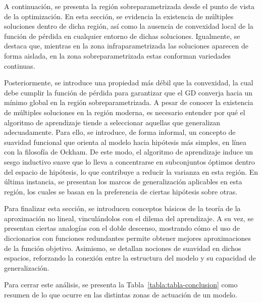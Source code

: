 A continuación, se presenta la región sobreparametrizada desde el punto de vista de la optimización. En esta sección, se evidencia la existencia de múltiples soluciones dentro de dicha región, así como la ausencia de convexidad local de la función de pérdida en cualquier entorno de dichas soluciones. Igualmente, se destaca que, mientras en la zona infraparametrizada las soluciones aparecen de forma aislada, en la zona sobreparametrizada estas conforman variedades continuas. 

Posteriormente, se introduce una propiedad más débil que la convexidad, la cual debe cumplir la función de pérdida para garantizar que el GD converja hacia un mínimo global en la región sobreparametrizada. A pesar de conocer la existencia de múltiples soluciones en la región moderna, es necesario entender por qué el algoritmo de aprendizaje tiende a seleccionar aquellas que generalizan adecuadamente. Para ello, se introduce, de forma informal, un concepto de suavidad funcional que orienta al modelo hacia hipótesis más simples, en línea con la filosofía de Ockham. De este modo, el algoritmo de aprendizaje induce un sesgo inductivo suave que lo lleva a concentrarse en subconjuntos óptimos dentro del espacio de hipótesis, lo que contribuye a reducir la varianza en esta región. En última instancia, se presentan los marcos de generalización aplicables en esta región, los cuales se basan en la preferencia de ciertas hipótesis sobre otras.

Para finalizar esta sección, se introducen conceptos básicos de la teoría de la aproximación no lineal, vinculándolos con el dilema del aprendizaje. A su vez, se presentan ciertas analogías con el doble descenso, mostrando cómo el uso de diccionarios con funciones redundantes permite obtener mejores aproximaciones de la función objetivo. Asimismo, se detallan nociones de suavidad en dichos espacios, reforzando la conexión entre la estructura del modelo y su capacidad de generalización.

Para cerrar este análisis, se presenta la Tabla~\ref{tabla:tabla-conclusion} como resumen de lo que ocurre en las distintas zonas de actuación de un modelo.

